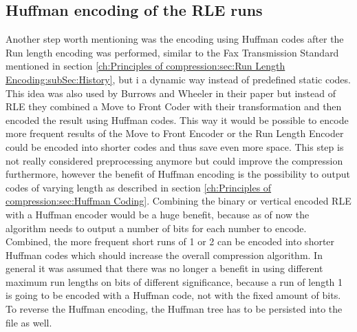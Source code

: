 {{\subsection{Huffman encoding of the RLE runs}
\label{ch:Conceptual Design:sec:Postprocessing}
\par{
Another step worth mentioning was the encoding using Huffman codes after the Run length encoding was performed, similar to the Fax Transmission Standard mentioned in section \ref{ch:Principles of compression:sec:Run Length Encoding:subSec:History}, but i a dynamic way instead of predefined static codes. This idea was also used by Burrows and Wheeler in their paper \cite{Burrows94} but instead of RLE they combined a Move to Front Coder with their transformation and then encoded the result using Huffman codes. This way it would be possible to encode more frequent results of the Move to Front Encoder or the Run Length Encoder could be encoded into shorter codes and thus save even more space. This step is not really considered preprocessing anymore but could improve the compression furthermore, however the benefit of Huffman encoding is the possibility to output codes of varying length as described in section \ref{ch:Principles of compression:sec:Huffman Coding}. Combining the binary or vertical encoded RLE with a Huffman encoder would be a huge benefit, because as of now the algorithm needs to output a number of bits for each number to encode. Combined, the more frequent short runs of 1 or 2 can be encoded into shorter Huffman codes which should increase the overall compression algorithm. In general it was assumed that there was no longer a benefit in using different maximum run lengths on bits of different significance, because a run of length 1 is going to be encoded with a Huffman code, not with the fixed amount of bits. To reverse the Huffman encoding, the Huffman tree has to be persisted into the file as well.
}

}}
